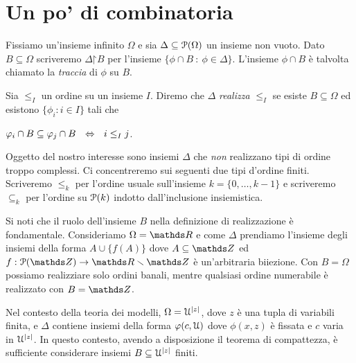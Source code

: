 \chapter{Un po' di combinatoria}\label{insiemi}

\lavori

\def\bigsum{\mathop{\mbox{\large$\displaystyle\sum$}}}
\def\bigint{\mathop{\mbox{\large$\displaystyle\int$}}}


Fissiamo un'insieme infinito $\Omega$ e sia $\Delta\subseteq\P(\Omega)$ un insieme non vuoto. Dato $B\subseteq \Omega$ scriveremo \emph{$\Delta\mathord\restriction B$\/} per l'insieme $\{\phi\cap B\ :\ \phi\in\Delta\}$. L'insieme $\phi\cap B$ \`e talvolta chiamato la \emph{traccia\/} di $\phi$ su $B$.

Sia $\le_I$ un ordine su un insieme $I$. Diremo che $\Delta$ \emph{realizza\/} $\le_I$ se esiste $B\subseteq \Omega$ ed esistono $\{\phi_i:i\in I\}$ tali che 

\hfil$\phi_i\cap B\subseteq\phi_j\cap B\ \ \IFF\ \ i\le_Ij$. 

Oggetto del nostro interesse sono insiemi $\Delta$ che \textit{non\/} realizzano tipi di ordine troppo complessi. Ci concentreremo sui seguenti due tipi d'ordine finiti. Scriveremo \emph{$\le_k$\/} per l'ordine usuale sull'insieme $k=\{0,\dots,k-1\}$ e scriveremo \emph{$\subseteq_k$\/} per l'ordine su $\P(k)$ indotto dall'inclusione insiemistica. 

Si noti che il ruolo dell'insieme $B$ nella definizione di realizzazione \`e fondamentale. Consideriamo $\Omega=\RR$ e come $\Delta$ prendiamo l'insieme degli insiemi della forma $A\cup\{f(A)\}$ dove $A\subseteq\ZZ$ ed $f:\P(\ZZ)\to \RR\sm\ZZ$ \`e un'arbitraria biiezione. Con $B=\Omega$ possiamo realizziare solo ordini banali, mentre qualsiasi ordine numerabile \`e realizzato con $B=\ZZ$. 

Nel contesto della teoria dei modelli, $\Omega=\U^{|z|}$, dove $z$ \`e una tupla di variabili finita,  e $\Delta$ contiene insiemi della forma $\phi(c,\U)$ dove $\phi(x,z)$  \`e fissata e $c$ varia in $\U^{|z|}$. In questo contesto, avendo a disposizione il teorema di compattezza, \`e sufficiente considerare insiemi $B\subseteq\U^{|z|}$ finiti.



